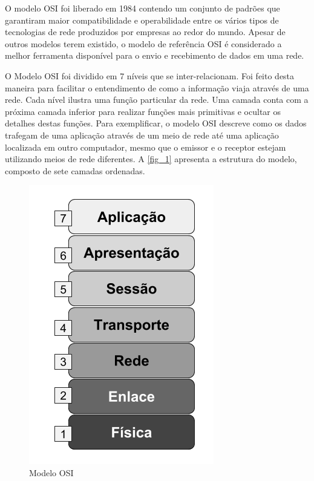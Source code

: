 \documentclass[
12pt,				%
openright,			%
oneside,			%
a4paper,			%
brazil,				%
]{abntex2}
\begin{document}
	\par O modelo OSI foi liberado em 1984 contendo um conjunto de padrões que garantiram maior compatibilidade e operabilidade entre os vários tipos de tecnologias de rede produzidos por empresas ao redor do mundo. Apesar de outros modelos terem existido, o modelo de referência OSI é considerado a melhor ferramenta disponível para o envio e recebimento de dados em uma rede.
	
	\par O Modelo OSI foi dividido em 7 níveis que se inter-relacionam. Foi feito desta maneira para facilitar o entendimento de como a informação viaja através de uma rede. Cada nível ilustra uma função particular da rede. Uma camada conta com a próxima camada inferior para realizar funções mais primitivas e ocultar os detalhes destas funções. Para exemplificar, o modelo OSI descreve como os dados trafegam de uma aplicação através de um meio de rede até uma aplicação localizada em outro computador, mesmo que o emissor e o receptor estejam utilizando meios de rede diferentes. A \autoref{fig_1} apresenta a estrutura do modelo, composto de sete camadas ordenadas.
	
	\begin{figure} [H]
		\centering
		\includegraphics[scale=.5]{figuras/cap2/01ModeloOSI}
		\caption{\label{fig_1}Modelo OSI}
	\end{figure}
		
\end{document}
